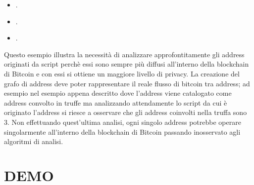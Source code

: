 \begin{example}
    \begin{itemize}
      \item {}.
      \item {}.
      \item {}.
    \end{itemize}

    Questo esempio illustra la necessità di analizzare approfontitamente gli address originati da script perchè essi sono sempre più diffusi all'interno della blockchain di Bitcoin e con essi si ottiene un maggiore livello di privacy.
    La creazione del grafo di address deve poter rappresentare il reale flusso di bitcoin tra address; ad esempio nel esempio appena descritto dove l'address   viene catalogato come address convolto in truffe ma analizzando attendamente lo script da cui è originato l'address si riesce a osservare che gli address coinvolti nella truffa sono 3.
    Non effettuando quest'ultima analisi, ogni singolo address potrebbe operare singolarmente all'interno della blockchain di Bitcoin passando inosservato agli algoritmi di analisi.
 \end{example}


\section{DEMO} \label{sec:solDemo}
